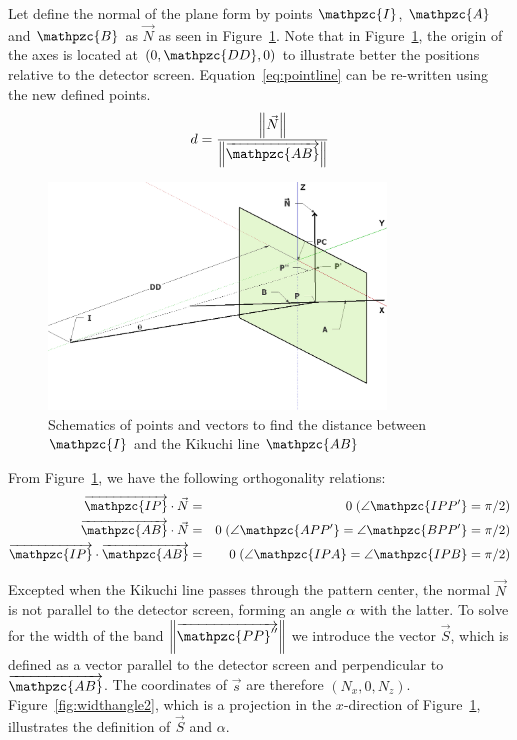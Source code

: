 \documentclass[letterpaper]{article}
\newcommand{\norm}[1]{\left\|#1\right\|}
\newcommand{\var}[1]{\mathpzc{#1}}
\begin{document}
	
	Let define the normal of the plane form by points $\var{I}$, $\var{A}$ and $\var{B}$ as $\vec{N}$ as seen in Figure~\ref{fig:widthangle1}. Note that in Figure~\ref{fig:widthangle1}, the origin of the axes is located at $(0,\var{DD},0)$ to illustrate better the positions relative to the detector screen. Equation~\ref{eq:pointline} can be re-written using the new defined points.
	\begin{eqnarray}
		d = \frac{\norm{\vec{N}}}{\norm{\overrightarrow{\var{AB}}}}
		\label{eq:pointline2}
	\end{eqnarray}
	
	\begin{figure}
		\centering
		\includegraphics[width=0.8\textwidth]{figures/widthangle1}
		\caption{Schematics of points and vectors to find the distance between $\var{I}$ and the Kikuchi line $\var{AB}$}
		\label{fig:widthangle1}
	\end{figure}
	
	From Figure~\ref{fig:widthangle1}, we have the following orthogonality relations:
	\begin{eqnarray}
		\overrightarrow{\var{IP}} \cdot \vec{N} & = & 0 \; (\angle\var{IPP^\prime} = \pi/2)\\
		\overrightarrow{\var{AB}} \cdot \vec{N} & = & 0 \; (\angle\var{APP^\prime} = \angle\var{BPP^\prime} = \pi/2)\\
		\overrightarrow{\var{IP}} \cdot \overrightarrow{\var{AB}} & = & 0 \; (\angle\var{IPA} = \angle\var{IPB} = \pi/2)
		\label{eq:orthogonality}
	\end{eqnarray}
	
	Excepted when the Kikuchi line passes through the pattern center, the normal $\vec{N}$ is not parallel to the detector screen, forming an angle $\alpha$ with the latter. To solve for the width of the band $\norm{\overrightarrow{\var{PP}^{\prime\prime}}}$ we introduce the vector $\vec{S}$, which is defined as a vector parallel to the detector screen and perpendicular to $\overrightarrow{\var{AB}}$. The coordinates of $\vec{s}$ are therefore $(N_x, 0, N_z)$. Figure~\ref{fig:widthangle2}, which is a projection in the $x$-direction of Figure~\ref{fig:widthangle1}, illustrates the definition of $\vec{S}$ and $\alpha$.
	
\end{document}
